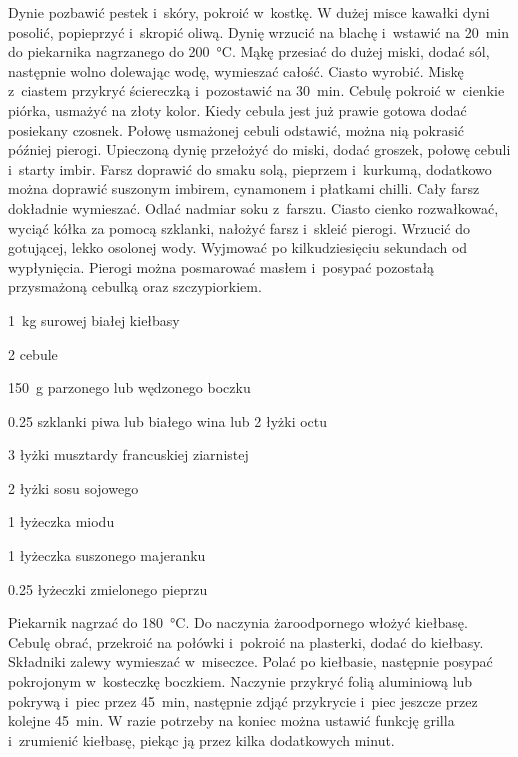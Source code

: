 \documentclass[../kucharek.tex]{subfiles}
\begin{document}
Dynie pozbawić pestek i~skóry, pokroić w~kostkę. W dużej misce kawałki dyni
posolić, popieprzyć i~skropić oliwą. Dynię wrzucić na blachę i~wstawić na
\qty{20}{\minute} do piekarnika nagrzanego do \qty{200}{\celsius}. Mąkę
przesiać do dużej miski, dodać sól, następnie wolno dolewając wodę, wymieszać
całość. Ciasto wyrobić. Miskę z~ciastem przykryć ściereczką i~pozostawić na
\qty{30}{\minute}. Cebulę pokroić w~cienkie piórka, usmażyć na złoty kolor.
Kiedy cebula jest już prawie gotowa dodać posiekany czosnek. Połowę usmażonej
cebuli odstawić, można nią pokrasić później pierogi. Upieczoną dynię przełożyć
do miski, dodać groszek, połowę cebuli i~starty imbir. Farsz doprawić do smaku
solą, pieprzem i~kurkumą, dodatkowo można doprawić suszonym imbirem, cynamonem
i płatkami chilli. Cały farsz dokładnie wymieszać. Odlać nadmiar soku z~farszu.
Ciasto cienko rozwałkować, wyciąć kółka za pomocą szklanki, nałożyć farsz
i~skleić pierogi. Wrzucić do gotującej, lekko osolonej wody. Wyjmować po
kilkudziesięciu sekundach od wypłynięcia. Pierogi można posmarować masłem
i~posypać pozostałą przysmażoną cebulką oraz szczypiorkiem.


\begin{Ingred}
    \item \qty{1}{\kilo\gram} surowej białej kiełbasy
    \item \num{2} cebule
    \item \qty{150}{\gram} parzonego lub wędzonego boczku
\end{Ingred}

\begin{Ingred}[zalewa]
    \item \num{.25} szklanki piwa lub białego wina lub \num{2} łyżki octu
    \item \num{3} łyżki musztardy francuskiej ziarnistej
    \item \num{2} łyżki sosu sojowego
    \item \num{1} łyżeczka miodu
    \item \num{1} łyżeczka suszonego majeranku
    \item \num{.25} łyżeczki zmielonego pieprzu
\end{Ingred}

Piekarnik nagrzać do \qty{180}{\celsius}. Do naczynia żaroodpornego włożyć
kiełbasę. Cebulę obrać, przekroić na połówki i~pokroić na plasterki, dodać do
kiełbasy. Składniki zalewy wymieszać w~miseczce. Polać po kiełbasie, następnie
posypać pokrojonym w~kosteczkę boczkiem. Naczynie przykryć folią aluminiową lub
pokrywą i~piec przez \qty{45}{\minute}, następnie zdjąć przykrycie i~piec
jeszcze przez kolejne \qty{45}{\minute}. W razie potrzeby na koniec można
ustawić funkcję grilla i~zrumienić kiełbasę, piekąc ją przez kilka dodatkowych
minut.
\end{document}
